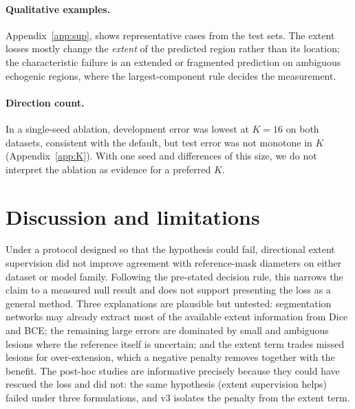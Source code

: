 \documentclass{midl}
\begin{document}
\paragraph{Qualitative examples.}
Appendix~\ref{app:sup},  shows representative cases from the test sets. The extent losses mostly change the \emph{extent} of the predicted region rather than its location; the characteristic failure is an extended or fragmented prediction on ambiguous echogenic regions, where the largest-component rule decides the measurement.

\paragraph{Direction count.}
In a single-seed ablation, development error was lowest at $K=16$ on both datasets, consistent with the default, but test error was not monotone in $K$ (Appendix~\ref{app:K}). With one seed and differences of this size, we do not interpret the ablation as evidence for a preferred $K$.

\section{Discussion and limitations}

Under a protocol designed so that the hypothesis could fail, directional extent supervision did not improve agreement with reference-mask diameters on either dataset or model family. Following the pre-stated decision rule, this narrows the claim to a measured null result and does not support presenting the loss as a general method. Three explanations are plausible but untested: segmentation networks may already extract most of the available extent information from Dice and BCE; the remaining large errors are dominated by small and ambiguous lesions where the reference itself is uncertain; and the extent term trades missed lesions for over-extension, which a negative penalty removes together with the benefit. The post-hoc studies are informative precisely because they could have rescued the loss and did not: the same hypothesis (extent supervision helps) failed under three formulations, and v3 isolates the penalty from the extent term.
\end{document}

